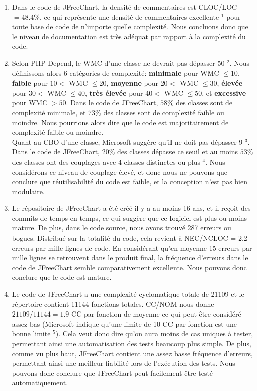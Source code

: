 \documentclass{article}
\begin{document}
\begin{enumerate}[leftmargin=*, label=Q\arabic*:]
\item
Dans le code de JFreeChart, la densité de commentaires est CLOC/LOC $= 48.4\%$, ce qui représente
une densité de commentaires excellente $^1$ pour toute base de code de n'importe quelle complexité.
Nous concluons donc que le niveau de documentation est très adéquat par rapport à la complexité
du code.

\item
Selon PHP Depend, le WMC d'une classe ne devrait pas dépasser 50 $^2$.
Nous définissons alors 6 catégories de complexité:
\textbf{minimale} pour WMC $\leq 10$,
\textbf{faible} pour $10 <$ WMC $\leq 20$,
\textbf{moyenne} pour $20 <$ WMC $\leq 30$,
\textbf{élevée} pour $30 <$ WMC $\leq 40$,
\textbf{très élevée} pour $40 <$ WMC $\leq 50$, et
\textbf{excessive} pour WMC $> 50$.
Dans le code de JFreeChart, $58\%$ des classes sont de complexité minimale, et $73\%$ des classes
sont de complexité faible ou moindre. Nous pourrions alors dire que le code est majoritairement
de complexité faible ou moindre.
\\
Quant au CBO d'une classe, Microsoft suggère qu'il ne doit pas dépasser 9 $^3$. Dans le code de
JFreeChart, $20\%$ des classes dépasse ce seuil et au moins $53\%$ des classes ont des couplages
avec 4 classes distinctes ou plus $^4$. Nous considérons ce niveau de couplage élevé, et donc nous ne
pouvons que conclure que réutilisabilité du code est faible, et la conception n'est pas bien
modulaire.

\item
Le répositoire de JFreeChart a été créé il y a au moins 16 ans, et il reçoit des commits de temps
en temps, ce qui suggère que ce logiciel est plus ou moins mature. De plus, dans le code source,
nous avons trouvé 287 erreurs ou bogues. Distribué sur la totalité du code, cela revient à
NEC/NCLOC = 2.2 erreurs par mille lignes de code. En considérant qu'en moyenne 15 erreurs par
mille lignes se retrouvent dans le produit final, la fréquence d'erreurs dans le code de JFreeChart
semble comparativement excellente. Nous pouvons donc conclure que le code est mature.

\item
Le code de JFreeChart a une complexité cyclomatique totale de 21109 et le répertoire contient 11144 fonctions totales. CC/NOM nous donne $21109/11144=1.9$ CC par fonction de moyenne ce qui peut-être considéré assez bas (Microsoft indique qu'une limite de 10 CC par fonction est une bonne limite $^5$). Cela veut donc dire qu'on aura moins de cas uniques à tester, permettant ainsi une automatisation des tests beaucoup plus simple. De plus, comme vu plus haut, JFreeChart contient une assez basse fréquence d'erreurs, permettant ainsi une meilleur fiabilité lors de l'exécution des tests. Nous pouvons donc conclure que JFreeChart peut facilement être testé automatiquement.
\end{enumerate}
\end{document}
